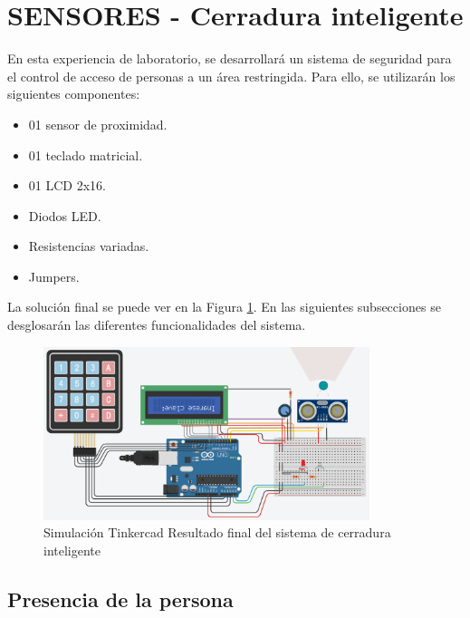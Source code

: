 
\section{SENSORES - Cerradura inteligente}

En esta experiencia de laboratorio, se desarrollará un sistema de seguridad para el control de acceso de personas a un área restringida. Para ello, se utilizarán los siguientes componentes: 

\begin{itemize}
    \item 01 sensor de proximidad.
    \item 01 teclado matricial.
    \item 01 LCD 2x16.
    \item Diodos LED.
    \item Resistencias variadas.
    \item Jumpers.
\end{itemize}

La solución final se puede ver en la Figura \ref{fig:cerradura_smart}. En las siguientes subsecciones se desglosarán las diferentes funcionalidades del sistema.

\begin{figure}[H]
    \centering
    \includegraphics[width=0.85\textwidth]{./img/ckpt_6.png}
    \caption{Simulación Tinkercad Resultado final del sistema de cerradura inteligente}
    \label{fig:cerradura_smart}
\end{figure}


\subsection{Presencia de la persona}

